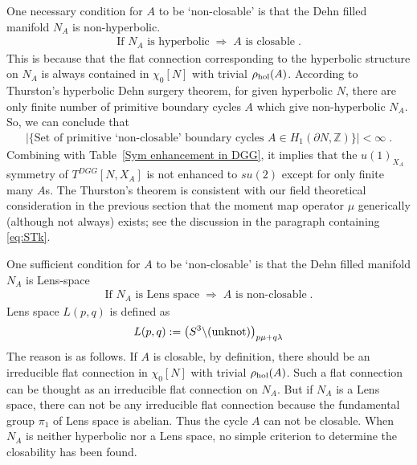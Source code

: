\documentclass[a4paper,11pt]{article}
\begin{document}
One  necessary condition for $A$ to be `non-closable' is that the Dehn filled manifold $N_A$ is non-hyperbolic.
%
\begin{align}
\textrm{If $N_A$ is hyperbolic} \; \Rightarrow \; \textrm{$A$ is closable}\;.
\end{align}
%
This is because that the flat connection corresponding to the hyperbolic structure on $N_A$ is always contained in $\chi_0[N]$ with trivial $ \rho_{\rm hol}(A)$. 
According to Thurston's hyperbolic Dehn surgery theorem, for given hyperbolic $N$, there are only finite number of primitive boundary cycles $A$ which give non-hyperbolic $N_A$. So, we can conclude that
%
\begin{align}
|\{\textrm{Set of  primitive `non-closable' boundary cycles $A \in H_1 (\partial N ,\mathbb{Z})$} \}| < \infty\;.
\end{align}
%
Combining with Table~\ref{Sym enhancement in DGG}, it implies that the $u(1)_{X_A}$ symmetry of $T^{DGG}[N,X_A]$ is not enhanced  to $su(2)$ except for only 
finite  many $A$s. The Thurston's theorem is consistent with our field theoretical consideration in the previous section that the moment map operator $\mu$
generically (although not always) exists; see the discussion in the paragraph containing \eqref{eq:STk}.






 
One sufficient condition for $A$ to be `non-closable' is that the Dehn filled manifold $N_A$ is Lens-space
%
\begin{align}
\textrm{If $N_A$ is Lens space} \; \Rightarrow \; \textrm{$A$ is non-closable}\;. \label{non-closable : Lens}
\end{align}
%
Lens space $L(p,q)$ is defined as
%
\begin{align}
L(p,q) := \big{(}S^3\backslash (\textrm{unknot}) \big{)}_{p\mu+ q\lambda}
\end{align}
The reason is as follows.
If $A$ is closable, by definition, there should be an irreducible flat connection in $\chi_0[N]$ with trivial $ \rho_{\rm hol}(A)$. Such a  flat connection can be thought as an irreducible flat connection on $N_A$. But if $N_A$ is a Lens space, there can not be any  irreducible flat connection because the fundamental group $\pi_1$ of Lens space is abelian.
Thus the cycle $A$ can not be closable.  When $N_A$ is neither hyperbolic nor a Lens space, no simple criterion to determine the closability has been found. 
\end{document}
